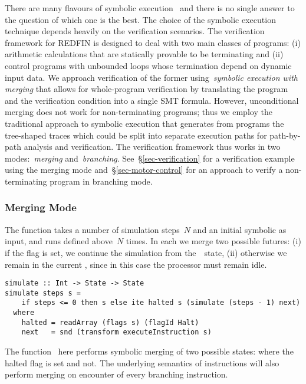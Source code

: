 There are many flavours of symbolic execution~\cite{SurveySymExec-CSUR18}
and there is no single answer to the question of which one is the best.
The choice of the symbolic execution technique depends heavily on the
verification scenarios. The verification framework for REDFIN is designed
to deal with two main classes of programs: (i) arithmetic calculations that
are statically provable to be terminating and (ii) control programs with
unbounded loops whose termination depend on dynamic input data. We approach
verification of the former using~\emph{symbolic execution with merging} that
allows for whole-program verification by translating the program and the
verification condition into a single SMT formula. However, unconditional merging
does not work for non-terminating programs; thus
we employ the traditional approach to symbolic execution that generates from programs
the tree-shaped traces which could be split into separate execution paths for path-by-path
analysis and verification. The verification framework thus works in two
modes:~\emph{merging} and~\emph{branching}. See~\S\ref{sec-verification} for
a verification example using the merging mode and~\S\ref{sec-motor-control} for
an approach to verify a non-terminating program in branching mode.

\subsubsection{Merging Mode}

The function  takes a number of simulation steps~$N$ and an initial
symbolic  as input, and runs  defined above~$N$
times. In each  we merge two possible futures: (i) if the 
flag is set, we continue the simulation from the~~state, (ii) otherwise
we remain in the current , since in this case the processor must
remain idle.

\vspace{1mm}
\begin{verbatim}
simulate :: Int -> State -> State
simulate steps s =
    if steps <= 0 then s else ite halted s (simulate (steps - 1) next)
  where
    halted = readArray (flags s) (flagId Halt)
    next   = snd (transform executeInstruction s)
\end{verbatim}
\vspace{1mm}

\noindent
The function~ here performs symbolic merging of two possible states:
where the halted flag is set and not. The underlying semantics of instructions
will also perform merging on encounter of every branching instruction.

